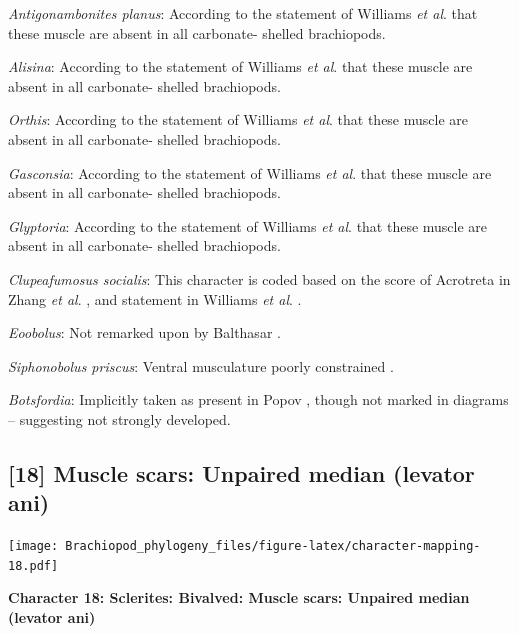 \documentclass[]{book}
\theoremstyle{definition}
\theoremstyle{definition}
\theoremstyle{definition}
\theoremstyle{remark}
\begin{document}
\emph{Antigonambonites planus}: According to the statement of Williams
\emph{et al}. \citeyearpar[P.32]{Williams2000BrachiopodaLinguliformea}
that these muscle are absent in all carbonate- shelled brachiopods.

\emph{Alisina}: According to the statement of Williams \emph{et al}.
\citeyearpar[P.32]{Williams2000BrachiopodaLinguliformea} that these
muscle are absent in all carbonate- shelled brachiopods.

\emph{Orthis}: According to the statement of Williams \emph{et al}.
\citeyearpar[P.32]{Williams2000BrachiopodaLinguliformea} that these
muscle are absent in all carbonate- shelled brachiopods.

\emph{Gasconsia}: According to the statement of Williams \emph{et al}.
\citeyearpar[P.32]{Williams2000BrachiopodaLinguliformea} that these
muscle are absent in all carbonate- shelled brachiopods.

\emph{Glyptoria}: According to the statement of Williams \emph{et al}.
\citeyearpar[P.32]{Williams2000BrachiopodaLinguliformea} that these
muscle are absent in all carbonate- shelled brachiopods.

\emph{Clupeafumosus socialis}: This character is coded based on the
score of Acrotreta in Zhang \emph{et al}.
\citeyearpar{Zhang2014Anearly}, and statement in Williams \emph{et al}.
\citeyearpar[P.32]{Williams2000BrachiopodaLinguliformea}.

\emph{Eoobolus}: Not remarked upon by Balthasar
\citeyearpar{Balthasar2009Thebrachiopod}.

\emph{Siphonobolus priscus}: Ventral musculature poorly constrained
\citep{Williams2000BrachiopodaLinguliformea, Popov2009Earlyontogeny}.

\emph{Botsfordia}: Implicitly taken as present in Popov
\citeyearpar{Popov1992TheCambrian}, though not marked in diagrams --
suggesting not strongly developed.

\hypertarget{muscle-scars-unpaired-median-levator-ani}{%
\subsection*{{[}18{]} Muscle scars: Unpaired median (levator
ani)}\label{muscle-scars-unpaired-median-levator-ani}}

\texttt{[image: Brachiopod\_phylogeny\_files/figure-latex/character-mapping-18.pdf]}

\textbf{Character 18: Sclerites: Bivalved: Muscle scars: Unpaired median
(levator ani)}
\end{document}
